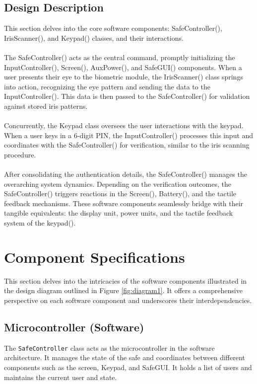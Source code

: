\documentclass{article}
\begin{document}
\subsection{Design Description}
This section delves into the core software components: SafeController(), IrisScanner(), and Keypad() classes, and their interactions. \\ \\
The SafeController() acts as the central command, promptly initializing the InputController(), Screen(), AuxPower(), and SafeGUI() components. When a user presents their eye to the biometric module, the IrisScanner() class springs into action, recognizing the eye pattern and sending the data to the InputController(). This data is then passed to the SafeController() for validation against stored iris patterns. \\ \\
Concurrently, the Keypad class oversees the user interactions with the keypad. When a user keys in a 6-digit PIN, the InputController() processes this input and coordinates with the SafeController() for verification, similar to the iris scanning procedure. \\ \\
After consolidating the authentication details, the SafeController() manages the overarching system dynamics. Depending on the verification outcomes, the SafeController() triggers reactions in the Screen(), Battery(), and the tactile feedback mechanisms. These software components seamlessly bridge with their tangible equivalents: the display unit, power units, and the tactile feedback system of the keypad().

\section{Component Specifications}
This section delves into the intricacies of the software components illustrated in the design diagram outlined in Figure \ref{fig:diagram1}. It offers a comprehensive perspective on each software component and underscores their interdependencies.

\subsection{Microcontroller (Software)}
The \texttt{SafeController} class acts as the microcontroller in the software architecture. It manages the state of the safe and coordinates between different components such as the screen, Keypad, and SafeGUI. It holds a list of users and maintains the current user and state.
\end{document}
